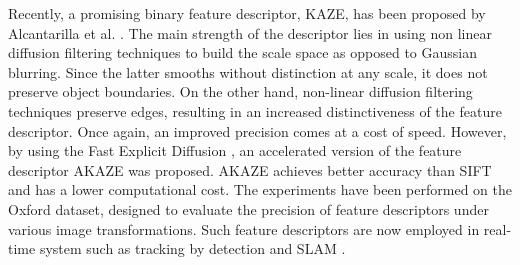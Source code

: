 Recently, a promising binary feature descriptor, KAZE, has been proposed by Alcantarilla et al. \cite{alcantarilla12}. The main strength of the descriptor lies in using non linear diffusion filtering techniques \cite{weickert98} to build the scale space as opposed to Gaussian blurring. Since the latter smooths without distinction at any scale, it does not preserve object boundaries. On the other hand, non-linear diffusion filtering techniques preserve edges, resulting in an increased distinctiveness of the feature descriptor. Once again, an improved precision comes at a cost of speed. However, by using the Fast Explicit Diffusion \cite{goesele2010}, an accelerated version of the feature descriptor AKAZE \cite{alcantarilla13} was proposed. AKAZE achieves better accuracy than SIFT and has a lower computational cost. The experiments have been performed on the Oxford dataset, designed to evaluate the precision of feature descriptors under various image transformations. Such feature descriptors are now employed in real-time system such as tracking by detection \cite{nebehay2014,pieropan15,pieropan15b} and  SLAM \cite{murartal2015}. 

